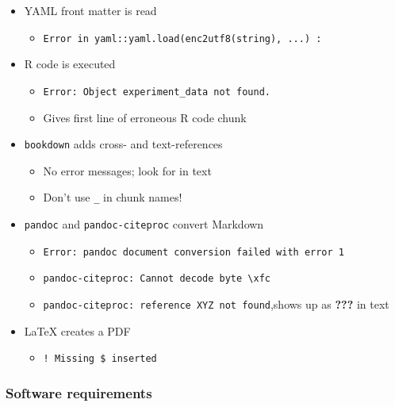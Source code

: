\documentclass[man,floatsintext]{apa6}
\providecommand{\tightlist}{%
  \setlength{\itemsep}{0pt}\setlength{\parskip}{0pt}}
\theoremstyle{definition}
\theoremstyle{definition}
\theoremstyle{definition}
\theoremstyle{remark}
\begin{document}
\begin{itemize}
\tightlist
\item
  YAML front matter is read

  \begin{itemize}
  \tightlist
  \item
    \texttt{Error\ in\ yaml::yaml.load(enc2utf8(string),\ ...)\ :}
  \end{itemize}
\item
  R code is executed

  \begin{itemize}
  \tightlist
  \item
    \texttt{Error:\ Object\ \textquotesingle{}experiment\_data\textquotesingle{}\ not\ found.}
  \item
    Gives first line of erroneous R code chunk
  \end{itemize}
\item
  \texttt{bookdown} adds cross- and text-references

  \begin{itemize}
  \tightlist
  \item
    No error messages; look for \texttt{\label{fig:chunk-name}} in text
  \item
    Don't use \texttt{\_} in chunk names!
  \end{itemize}
\item
  \texttt{pandoc} and \texttt{pandoc-citeproc} convert Markdown

  \begin{itemize}
  \tightlist
  \item
    \texttt{Error:\ pandoc\ document\ conversion\ failed\ with\ error\ 1}
  \item
    \texttt{pandoc-citeproc:\ Cannot\ decode\ byte\ \textquotesingle{}\textbackslash{}xfc\textquotesingle{}}
  \item
    \texttt{pandoc-citeproc:\ reference\ XYZ\ not\ found},shows up as
    \textbf{???} in text
  \end{itemize}
\item
  LaTeX creates a PDF

  \begin{itemize}
  \tightlist
  \item
    \texttt{!\ Missing\ \$\ inserted}
  \end{itemize}
\end{itemize}

\subsubsection{Software requirements}\label{software-requirements}
\end{document}

